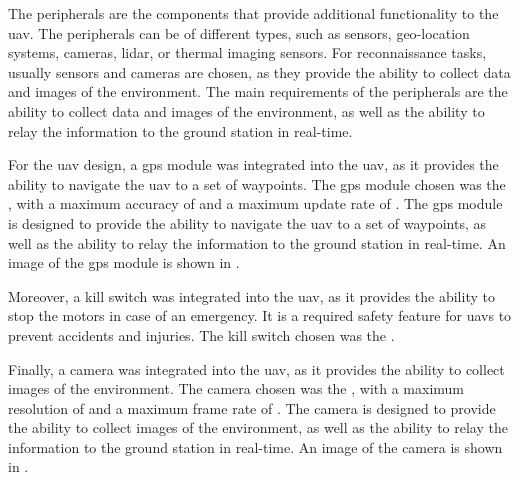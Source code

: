 The peripherals are the components that provide additional functionality to the \gls{uav}. The peripherals can be of different types, such as sensors, geo-location systems, cameras, lidar, or thermal imaging sensors. For reconnaissance tasks, usually sensors and cameras are chosen, as they provide the ability to collect data and images of the environment. The main requirements of the peripherals are the ability to collect data and images of the environment, as well as the ability to relay the information to the ground station in real-time.

For the \gls{uav} design, a \gls{gps} module was integrated into the \gls{uav}, as it provides the ability to navigate the \gls{uav} to a set of waypoints. The \gls{gps} module chosen was the , with a maximum accuracy of  and a maximum update rate of . The \gls{gps} module is designed to provide the ability to navigate the \gls{uav} to a set of waypoints, as well as the ability to relay the information to the ground station in real-time. An image of the \gls{gps} module is shown in .


Moreover, a kill switch was integrated into the \gls{uav}, as it provides the ability to stop the motors in case of an emergency. It is a required safety feature for \glspl{uav} to prevent accidents and injuries. The kill switch chosen was the .


Finally, a camera was integrated into the \gls{uav}, as it provides the ability to collect images of the environment. The camera chosen was the , with a maximum resolution of  and a maximum frame rate of . The camera is designed to provide the ability to collect images of the environment, as well as the ability to relay the information to the ground station in real-time. An image of the camera is shown in .



